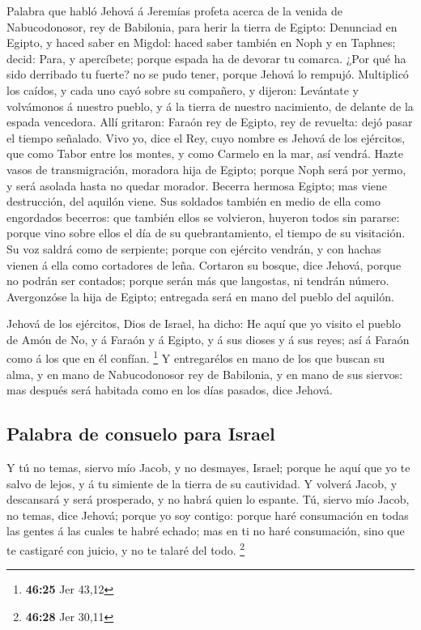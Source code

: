  Palabra que habló Jehová á Jeremías profeta acerca de la
venida de Nabucodonosor, rey de Babilonia, para herir la tierra de
Egipto:  Denunciad en Egipto, y haced saber en Migdol:
haced saber también en Noph y en Taphnes; decid: Para, y apercíbete;
porque espada ha de devorar tu comarca.  ¿Por qué ha sido
derribado tu fuerte? no se pudo tener, porque Jehová lo rempujó.
 Multiplicó los caídos, y cada uno cayó sobre su compañero,
y dijeron: Levántate y volvámonos á nuestro pueblo, y á la tierra de
nuestro nacimiento, de delante de la espada vencedora. 
Allí gritaron: Faraón rey de Egipto, rey de revuelta: dejó pasar el
tiempo señalado.  Vivo yo, dice el Rey, cuyo nombre es
Jehová de los ejércitos, que como Tabor entre los montes, y como Carmelo
en la mar, así vendrá.  Hazte vasos de transmigración,
moradora hija de Egipto; porque Noph será por yermo, y será asolada
hasta no quedar morador.  Becerra hermosa Egipto; mas viene
destrucción, del aquilón viene.  Sus soldados también en
medio de ella como engordados becerros: que también ellos se volvieron,
huyeron todos sin pararse: porque vino sobre ellos el día de su
quebrantamiento, el tiempo de su visitación.  Su voz saldrá
como de serpiente; porque con ejército vendrán, y con hachas vienen á
ella como cortadores de leña.  Cortaron su bosque, dice
Jehová, porque no podrán ser contados; porque serán más que langostas,
ni tendrán número.  Avergonzóse la hija de Egipto;
entregada será en mano del pueblo del aquilón.

 Jehová de los ejércitos, Dios de Israel, ha dicho: He aquí
que yo visito el pueblo de Amón de No, y á Faraón y á Egipto, y á sus
dioses y á sus reyes; así á Faraón como á los que en él confían.
\footnote{\textbf{46:25} Jer 43,12}  Y entregarélos en mano
de los que buscan su alma, y en mano de Nabucodonosor rey de Babilonia,
y en mano de sus siervos: mas después será habitada como en los días
pasados, dice Jehová.

\hypertarget{palabra-de-consuelo-para-israel}{%
\subsection{Palabra de consuelo para
Israel}\label{palabra-de-consuelo-para-israel}}

 Y tú no temas, siervo mío Jacob, y no desmayes, Israel;
porque he aquí que yo te salvo de lejos, y á tu simiente de la tierra de
su cautividad. Y volverá Jacob, y descansará y será prosperado, y no
habrá quien lo espante.  Tú, siervo mío Jacob, no temas,
dice Jehová; porque yo soy contigo: porque haré consumación en todas las
gentes á las cuales te habré echado; mas en ti no haré consumación, sino
que te castigaré con juicio, y no te talaré del todo. \footnote{\textbf{46:28}
  Jer 30,11}

